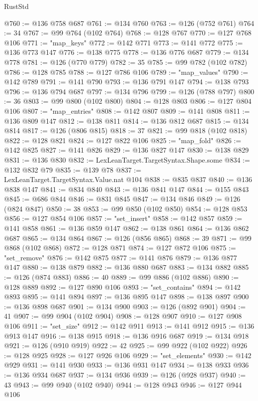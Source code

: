\begin{lexlean}{RustStd}
\begin{coremodule}
@760 := @136 @758 @687
@761 := @134 @760
@763 := @126 (@752 @761)
@764 := 34
@767 := @99 @764 (@102 @764)
@768 := @128 @767
@770 := @127 @768 @106
@771 := "map_keys"
@772 := @142 @771
@773 := @141 @772
@775 := @136 @773 @147
@776 := @138 @775
@778 := @136 @776 @687
@779 := @134 @778
@781 := @126 (@770 @779)
@782 := 35
@785 := @99 @782 (@102 @782)
@786 := @128 @785
@788 := @127 @786 @106
@789 := "map_values"
@790 := @142 @789
@791 := @141 @790
@793 := @136 @791 @147
@794 := @138 @793
@796 := @136 @794 @687
@797 := @134 @796
@799 := @126 (@788 @797)
@800 := 36
@803 := @99 @800 (@102 @800)
@804 := @128 @803
@806 := @127 @804 @106
@807 := "map_entries"
@808 := @142 @807
@809 := @141 @808
@811 := @136 @809 @147
@812 := @138 @811
@814 := @136 @812 @687
@815 := @134 @814
@817 := @126 (@806 @815)
@818 := 37
@821 := @99 @818 (@102 @818)
@822 := @128 @821
@824 := @127 @822 @106
@825 := "map_fold"
@826 := @142 @825
@827 := @141 @826
@829 := @136 @827 @147
@830 := @138 @829
@831 := @136 @830
@832 := LexLeanTarget.TargetSyntax.Shape.some
@834 := @132 @832 @79
@835 := @139 @78
@837 := LexLeanTarget.TargetSyntax.Value.nat @104
@838 := @835 @837
@840 := @136 @838 @147
@841 := @834 @840
@843 := @136 @841 @147
@844 := @155 @843
@845 := @686 @844
@846 := @831 @845
@847 := @134 @846
@849 := @126 (@824 @847)
@850 := 38
@853 := @99 @850 (@102 @850)
@854 := @128 @853
@856 := @127 @854 @106
@857 := "set_insert"
@858 := @142 @857
@859 := @141 @858
@861 := @136 @859 @147
@862 := @138 @861
@864 := @136 @862 @687
@865 := @134 @864
@867 := @126 (@856 @865)
@868 := 39
@871 := @99 @868 (@102 @868)
@872 := @128 @871
@874 := @127 @872 @106
@875 := "set_remove"
@876 := @142 @875
@877 := @141 @876
@879 := @136 @877 @147
@880 := @138 @879
@882 := @136 @880 @687
@883 := @134 @882
@885 := @126 (@874 @883)
@886 := 40
@889 := @99 @886 (@102 @886)
@890 := @128 @889
@892 := @127 @890 @106
@893 := "set_contains"
@894 := @142 @893
@895 := @141 @894
@897 := @136 @895 @147
@898 := @138 @897
@900 := @136 @898 @687
@901 := @134 @900
@903 := @126 (@892 @901)
@904 := 41
@907 := @99 @904 (@102 @904)
@908 := @128 @907
@910 := @127 @908 @106
@911 := "set_size"
@912 := @142 @911
@913 := @141 @912
@915 := @136 @913 @147
@916 := @138 @915
@918 := @136 @916 @687
@919 := @134 @918
@921 := @126 (@910 @919)
@922 := 42
@925 := @99 @922 (@102 @922)
@926 := @128 @925
@928 := @127 @926 @106
@929 := "set_elements"
@930 := @142 @929
@931 := @141 @930
@933 := @136 @931 @147
@934 := @138 @933
@936 := @136 @934 @687
@937 := @134 @936
@939 := @126 (@928 @937)
@940 := 43
@943 := @99 @940 (@102 @940)
@944 := @128 @943
@946 := @127 @944 @106

\end{coremodule}
\end{lexlean}
